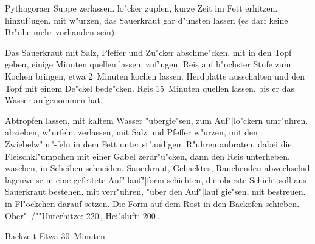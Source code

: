 \begin{recipe}{Pythagoraer Suppe}
 zerlassen.
 lo"cker zupfen, kurze Zeit im Fett
  erhitzen.
 hinzuf"ugen, mit
 w"urzen, das Sauerkraut gar d"unsten lassen
  (es darf keine Br"uhe mehr vorhanden sein).

  Das Sauerkraut mit Salz, Pfeffer und Zu"cker abschme"cken.
 mit
 in den Topf geben, einige
  Minuten quellen lassen.
 zuf"ugen, Reis auf h"ochster Stufe zum Kochen
  bringen, etwa 2~Minuten kochen lassen.  Herdplatte ausschalten und den
  Topf mit einem De"ckel bede"cken.  Reis 15~Minuten quellen lassen, bis er
  das Wasser aufgenommen hat.

  Abtropfen lassen, mit kaltem Wasser "ubergie"sen, zum Auf"|lo"ckern
  umr"uhren.
 abziehen, w"urfeln.
 zerlassen,
 mit
  Salz und Pfeffer w"urzen, mit den Zwiebelw"ur"-feln in dem Fett unter
  st"andigem R"uhren anbraten, dabei die Fleischkl"umpchen mit einer Gabel
  zerdr"u"cken, dann den Reis unterheben.
 waschen, in Scheiben
  schneiden.  Sauerkraut, Gehacktes, Rauchenden abwechselnd lagenweise in
  eine gefettete Auf"|lauf"|form schichten, die oberste Schicht soll aus
  Sauerkraut bestehen.
 mit
 verr"uhren, "uber den Auf"|lauf gie"sen,
  mit
 bestreuen.
 in Fl"ockchen darauf setzen.  Die Form auf
  dem Rost in den Backofen schieben.  Ober"~/""Unterhitze:
  220\,\textcelsius, Hei"sluft: 200\,\textcelsius.
\item[Backzeit] Etwa 30~Minuten
\end{recipe}
